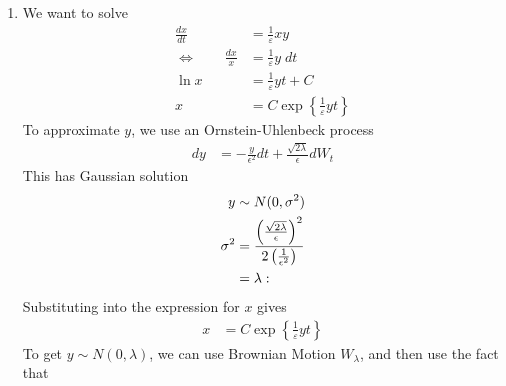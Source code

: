 \documentclass[12pt]{article}
\theoremstyle{plain}
\theoremstyle{definition}
\theoremstyle{remark}
\begin{document}
\begin{enumerate}
\begin{enumerate}
    \item %
      We want to solve
      \begin{align*}
        \frac{dx}{dt}
        &= \frac{1}{\varepsilon} xy \\
        \Leftrightarrow \qquad
        \frac{dx}{x}
        &= \frac{1}{\varepsilon} y \; dt \\
        \ln x
          &= \frac{1}{\varepsilon} y t + C \\
        x &= C\exp\left\{ \frac{1}{\varepsilon} y t \right\}
      \end{align*}
      To approximate $y$, we use an Ornstein-Uhlenbeck process
      \begin{align*}
        dy &=
        -\frac{y}{\epsilon^2} dt + \frac{\sqrt{2\lambda}}{\epsilon} dW_t
      \end{align*}
      This has Gaussian solution
      \begin{align*}
        y &\sim N(0, \sigma^2) \\
        \sigma^2 &=
        \frac{\left(\frac{\sqrt{2\lambda}}{\epsilon}\right)^2}{%
          2\left(\frac{1}{\epsilon^2}\right)}\\
        &= \lambda:
      \end{align*}
      Substituting into the expression for $x$ gives
      \begin{align*}
        x &= C\exp\left\{ \frac{1}{\varepsilon} y t \right\}
      \end{align*}
      To get $y \sim N(0,\lambda)$, we can use Brownian Motion
      $W_\lambda$, and then use the fact that
      \begin{align*}
      \end{align*}


  \end{enumerate}


\end{enumerate}
\end{document}
